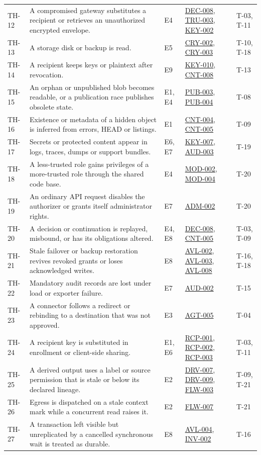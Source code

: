 \documentclass[11pt,a4paper]{article}
\newcommand{\rr}[1]{\hyperlink{req:#1}{#1}}
\begin{document}
\begin{longtable}{@{}P{0.07\textwidth}P{0.34\textwidth}P{0.08\textwidth}P{0.29\textwidth}P{0.12\textwidth}@{}}
TH-12 & A compromised gateway substitutes a recipient or retrieves an unauthorized encrypted envelope. & E4 & \rr{DEC-008}, \rr{TRU-003}, \rr{KEY-002} & T-03, T-11\\
TH-13 & A storage disk or backup is read. & E5 & \rr{CRY-002}, \rr{CRY-003} & T-10, T-18\\
TH-14 & A recipient keeps keys or plaintext after revocation. & E9 & \rr{KEY-010}, \rr{CNT-008} & T-13\\
TH-15 & An orphan or unpublished blob becomes readable, or a publication race publishes obsolete state. & E1, E4 & \rr{PUB-003}, \rr{PUB-004} & T-08\\
TH-16 & Existence or metadata of a hidden object is inferred from errors, HEAD or listings. & E1 & \rr{CNT-004}, \rr{CNT-005} & T-09\\
TH-17 & Secrets or protected content appear in logs, traces, dumps or support bundles. & E6, E7 & \rr{KEY-007}, \rr{AUD-003} & T-19\\
TH-18 & A less-trusted role gains privileges of a more-trusted role through the shared code base. & E4 & \rr{MOD-002}, \rr{MOD-004} & T-20\\
TH-19 & An ordinary API request disables the authorizer or grants itself administrator rights. & E7 & \rr{ADM-002} & T-20\\
TH-20 & A decision or continuation is replayed, misbound, or has its obligations altered. & E4, E8 & \rr{DEC-008}, \rr{CNT-005} & T-03, T-09\\
TH-21 & Stale failover or backup restoration revives revoked grants or loses acknowledged writes. & E8 & \rr{AVL-002}, \rr{AVL-003}, \rr{AVL-008} & T-16, T-18\\
TH-22 & Mandatory audit records are lost under load or exporter failure. & E7 & \rr{AUD-002} & T-15\\
TH-23 & A connector follows a redirect or rebinding to a destination that was not approved. & E3 & \rr{AGT-005} & T-04\\
TH-24 & A recipient key is substituted in enrollment or client-side sharing. & E1, E6 & \rr{RCP-001}, \rr{RCP-002}, \rr{RCP-003} & T-03, T-11\\
TH-25 & A derived output uses a label or source permission that is stale or below its declared lineage. & E2 & \rr{DRV-007}, \rr{DRV-009}, \rr{FLW-003} & T-09, T-21\\
TH-26 & Egress is dispatched on a stale context mark while a concurrent read raises it. & E2 & \rr{FLW-007} & T-21\\
TH-27 & A transaction left visible but unreplicated by a cancelled synchronous wait is treated as durable. & E8 & \rr{AVL-004}, \rr{INV-002} & T-16\\
\bottomrule
\end{longtable}
\end{document}
